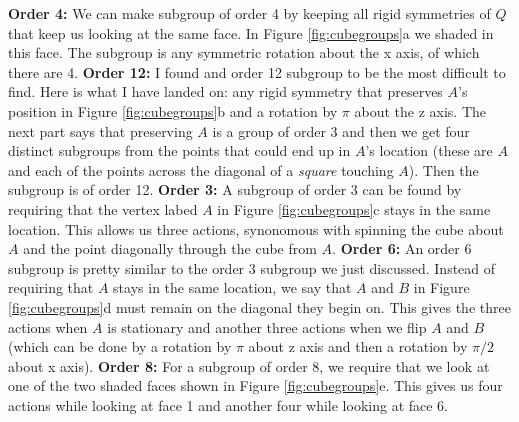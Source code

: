 \documentclass[11pt]{article}
\begin{document}
{        \noindent
        {\bf Order 4:}
        We can make subgroup of order 4 by keeping all rigid symmetries of $Q$ that keep us looking at the same face.
        In Figure \ref{fig:cubegroups}a we shaded in this face.
        The subgroup is any symmetric rotation about the x axis, of which there are 4. \parspace
        {\bf Order 12:} I found and order 12 subgroup to be the most difficult to find.
        Here is what I have landed on: any rigid symmetry that preserves $A$'s position in Figure \ref{fig:cubegroups}b and a rotation by $\pi$ about the z axis.
        The next part says that preserving $A$ is a group of order 3 and then we get four distinct subgroups from the points that could end up in $A$'s location (these are $A$ and each of the points across the diagonal of a {\it square} touching $A$).
        Then the subgroup is of order 12. \parspace
        {\bf Order 3:} A subgroup of order 3 can be found by requiring that the vertex labed $A$ in Figure \ref{fig:cubegroups}c stays in the same location.
        This allows us three actions, synonomous with spinning the cube about $A$ and the point diagonally through the cube from $A$. \parspace
        {\bf Order 6:} An order 6 subgroup is pretty similar to the order 3 subgroup we just discussed.
        Instead of requiring that $A$ stays in the same location, we say that $A$ and $B$ in Figure \ref{fig:cubegroups}d must remain on the diagonal they begin on.
        This gives the three actions when $A$ is stationary and another three actions when we flip $A$ and $B$ (which can be done by a rotation by $\pi$ about z axis and then a rotation by $\pi /2$ about x axis). \parspace
        {\bf Order 8:} For a subgroup of order 8, we require that we look at one of the two shaded faces shown in Figure \ref{fig:cubegroups}e.
        This gives us four actions while looking at face 1 and another four while looking at face 6. \parspace
    }
\end{document}
